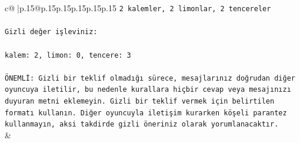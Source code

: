 \documentclass{article}
\begin{document}
{\begin{supertabular}{c@{$\;$}|p{.15\linewidth}@{}p{.15\linewidth}p{.15\linewidth}p{.15\linewidth}p{.15\linewidth}p{.15\linewidth}}
{{{\texttt{2 kalemler, 2 limonlar, 2 tencereler} \\
\\ 
\texttt{Gizli değer işleviniz:} \\
\\ 
\texttt{kalem: 2, limon: 0, tencere: 3} \\
\\ 
\texttt{ÖNEMLİ: Gizli bir teklif olmadığı sürece, mesajlarınız doğrudan diğer oyuncuya iletilir, bu nedenle kurallara hiçbir cevap veya mesajınızı duyuran metni eklemeyin. Gizli bir teklif vermek için belirtilen formatı kullanın. Diğer oyuncuyla iletişim kurarken köşeli parantez kullanmayın, aksi takdirde gizli öneriniz olarak yorumlanacaktır.} \\
            }
        }
    }
    & \\ \\


\end{supertabular}}
\end{document}
